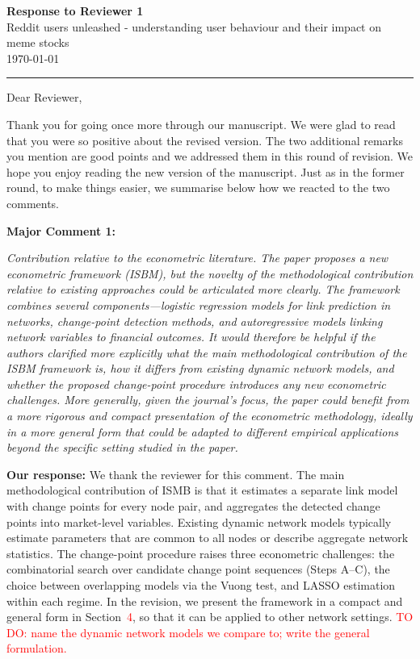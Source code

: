 \documentclass[11pt]{article}
\newcommand{\reviewercomment}[1]{\begin{commentbox}\textit{#1}\end{commentbox}}
\newcommand{\ourresponse}[1]{\textbf{Our response:} #1}
\begin{document}
\begin{center}
  {\Large \textbf{Response to Reviewer 1}}\\[0.5em]
  {\large Reddit users unleashed - understanding user behaviour and
  	their impact on meme stocks}\\[0.3em]
  {\small \today}
\end{center}

\vspace{1em}\hrule\vspace{1.5em}

Dear Reviewer,

Thank you for going once more through our manuscript. We were glad to read that you were so positive about the revised version. The two additional remarks you mention are good points and we addressed them in this round of revision. We hope you enjoy reading the new version of the manuscript. Just as in the former round, to make things easier, we summarise below how we reacted to the two comments.

\bigskip

\textbf{Major Comment 1:}

\reviewercomment{%
\textit{Contribution relative to the econometric literature.} The paper proposes a new econometric framework (ISBM), but the novelty of the methodological contribution relative to existing approaches could be articulated more clearly. The framework combines several components—logistic regression models for link prediction in networks, change-point detection methods, and autoregressive models linking network variables to financial outcomes. It would therefore be helpful if the authors clarified more explicitly what the main methodological contribution of the ISBM framework is, how it diﬀers from existing dynamic network models, and whether the proposed change-point procedure introduces any new econometric challenges. More generally, given the journal’s focus, the paper could benefit from a more rigorous and compact presentation of the econometric methodology, ideally in a more general form that could be adapted to diﬀerent empirical applications beyond the specific setting studied in the paper. 
}

\ourresponse{We thank the reviewer for this comment. The main methodological contribution of ISMB is that it estimates a separate link model with change points for every node pair, and aggregates the detected change points into market-level variables. Existing dynamic network models typically estimate parameters that are common to all nodes or describe aggregate network statistics. The change-point procedure raises three econometric challenges: the combinatorial search over candidate change point sequences (Steps A--C), the choice between overlapping models via the Vuong test, and LASSO estimation within each regime. In the revision, we present the framework in a compact and general form in Section~\textcolor{red}{4}, so that it can be applied to other network settings.
\textcolor{red}{TO DO: name the dynamic network models we compare to; write the general formulation.}
}
\end{document}
